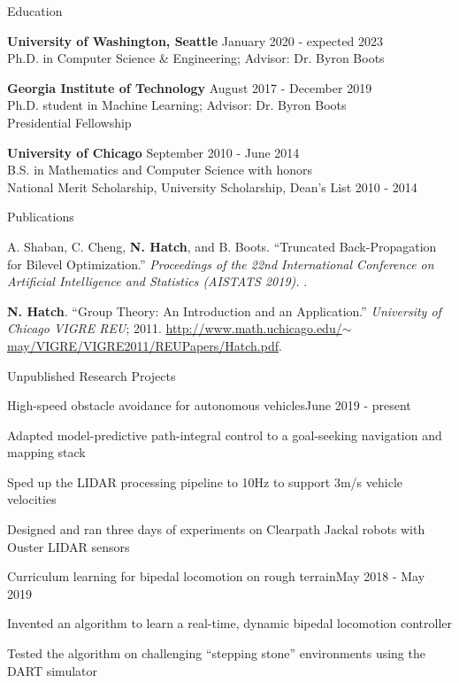 \documentclass{resume} %
\begin{document}
\begin{rSection}{Education}

{\bf University of Washington, Seattle} \hfill {January 2020 - expected 2023} \\
Ph.D. in Computer Science \& Engineering; Advisor: Dr. Byron Boots

{\bf Georgia Institute of Technology} \hfill {August 2017 - December 2019} \\
Ph.D. student in Machine Learning; Advisor: Dr. Byron Boots \\
Presidential Fellowship

{\bf University of Chicago} \hfill {September 2010 - June 2014} \\
B.S. in Mathematics and Computer Science with honors \\
National Merit Scholarship, University Scholarship, Dean's List 2010 - 2014

\end{rSection}

\begin{rSection}{Publications}

A. Shaban, C. Cheng, {\bf N. Hatch}, and B. Boots. ``Truncated Back-Propagation for Bilevel Optimization.''
{\em Proceedings of the 22nd International Conference on Artificial Intelligence and Statistics (AISTATS 2019).}
.

{\bf N. Hatch}. ``Group Theory: An Introduction and an Application.'' {\em University of Chicago VIGRE REU}; 2011.
\href{http://www.math.uchicago.edu/~may/VIGRE/VIGRE2011/REUPapers/Hatch.pdf}{http://www.math.uchicago.edu/$\sim$may/VIGRE/VIGRE2011/REUPapers/Hatch.pdf}.

\end{rSection}

\begin{rSection}{Unpublished Research Projects}
\begin{rProject}{High-speed obstacle avoidance for autonomous vehicles}{June 2019 - present}
\item Adapted model-predictive path-integral control to a goal-seeking navigation and mapping stack
\item Sped up the LIDAR processing pipeline to 10Hz to support 3m/s vehicle velocities
\item Designed and ran three days of experiments on Clearpath Jackal robots with Ouster LIDAR sensors
\end{rProject}
\begin{rProject}{Curriculum learning for bipedal locomotion on rough terrain}{May 2018 - May 2019}
\item Invented an algorithm to learn a real-time, dynamic bipedal locomotion controller
\item Tested the algorithm on challenging ``stepping stone'' environments using the DART simulator
\end{rProject}
\end{rSection}
\end{document}
